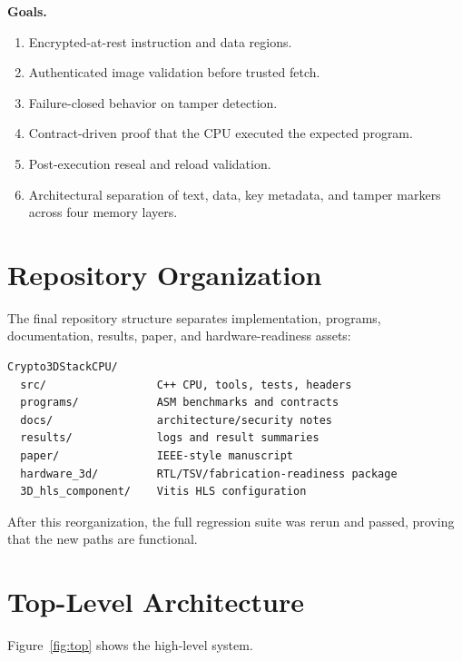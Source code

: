 \documentclass[conference]{IEEEtran}
\begin{document}
\textbf{Goals.}
\begin{enumerate}[label=G\arabic*.,leftmargin=*]
    \item Encrypted-at-rest instruction and data regions.
    \item Authenticated image validation before trusted fetch.
    \item Failure-closed behavior on tamper detection.
    \item Contract-driven proof that the CPU executed the expected program.
    \item Post-execution reseal and reload validation.
    \item Architectural separation of text, data, key metadata, and tamper markers across four memory layers.
\end{enumerate}

\section{Repository Organization}

The final repository structure separates implementation, programs, documentation, results, paper, and hardware-readiness assets:

\begin{lstlisting}
Crypto3DStackCPU/
  src/                 C++ CPU, tools, tests, headers
  programs/            ASM benchmarks and contracts
  docs/                architecture/security notes
  results/             logs and result summaries
  paper/               IEEE-style manuscript
  hardware_3d/         RTL/TSV/fabrication-readiness package
  3D_hls_component/    Vitis HLS configuration
\end{lstlisting}

After this reorganization, the full regression suite was rerun and passed, proving that the new paths are functional.

\section{Top-Level Architecture}

Figure~\ref{fig:top} shows the high-level system.
\end{document}
